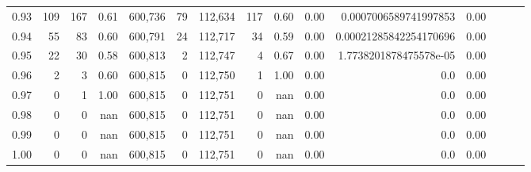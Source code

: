 \begin{tabular}{rrrrrrrrrrrrrrr}
0.93 &     109 &    167 &  0.61 &  600,736 &       79 &  112,634 &      117 &  0.60 &  0.00 &   0.0007006589741997853 &      0.00 \\
0.94 &      55 &     83 &  0.60 &  600,791 &       24 &  112,717 &       34 &  0.59 &  0.00 &  0.00021285842254170696 &      0.00 \\
0.95 &      22 &     30 &  0.58 &  600,813 &        2 &  112,747 &        4 &  0.67 &  0.00 &  1.7738201878475578e-05 &      0.00 \\
0.96 &       2 &      3 &  0.60 &  600,815 &        0 &  112,750 &        1 &  1.00 &  0.00 &                     0.0 &      0.00 \\
0.97 &       0 &      1 &  1.00 &  600,815 &        0 &  112,751 &        0 &   nan &  0.00 &                     0.0 &      0.00 \\
0.98 &       0 &      0 &   nan &  600,815 &        0 &  112,751 &        0 &   nan &  0.00 &                     0.0 &      0.00 \\
0.99 &       0 &      0 &   nan &  600,815 &        0 &  112,751 &        0 &   nan &  0.00 &                     0.0 &      0.00 \\
1.00 &       0 &      0 &   nan &  600,815 &        0 &  112,751 &        0 &   nan &  0.00 &                     0.0 &      0.00 \\
\bottomrule
\end{tabular}
